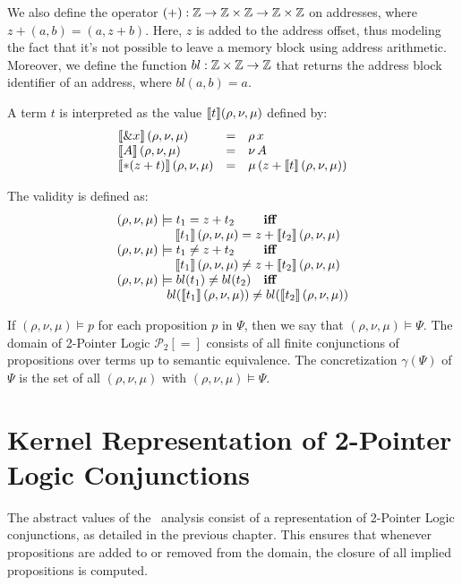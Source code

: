 We also define the operator $(+) : \mathbb{Z} \rightarrow \mathbb{Z} \times \mathbb{Z} \rightarrow \mathbb{Z} \times \mathbb{Z}$ on addresses, where $z + (a,b) = (a, z+b)$.
Here, $z$ is added to the address offset, thus modeling the fact that it's not possible to leave a memory block using address arithmetic.
Moreover, we define the function $bl : \mathbb{Z} \times \mathbb{Z} \rightarrow \mathbb{Z}$ that returns the address block identifier of an address, where $bl(a,b) = a$.

A term $t$ is interpreted as the value $\llbracket t\rrbracket(\rho, \nu, \mu)$ defined by:
\[
  \begin{array}{lll}
    \llbracket\& x\rrbracket\,(\rho,\nu,\mu)   & = & \rho\,x                          \\
    \llbracket A\rrbracket\,(\rho,\nu,\mu)      & = & \nu\,A                           \\
    \llbracket*(z+t)\rrbracket\,(\rho,\nu,\mu) & = & \mu\,(z+\llbracket t\rrbracket\,(\rho,\nu,\mu)) \\
  \end{array}
\]

The validity is defined as:
\[
  \begin{array}{ll}
    (\rho,\nu,\mu)\models t_1 = z+t_2          & \textbf{iff}
    \\ \multicolumn{2}{c}{\quad\quad\quad\quad\sem{t_1}\,(\rho,\nu,\mu) = z+\sem{t_2}\,(\rho,\nu,\mu)}	\\
    (\rho,\nu,\mu)\models t_1 \neq z+t_2       & \textbf{iff}
    \\ \multicolumn{2}{c}{\quad\quad\quad\quad\sem{t_1}\,(\rho,\nu,\mu) \neq z+\sem{t_2}\,(\rho,\nu,\mu)}	\\
    (\rho,\nu,\mu)\models bl(t_1) \neq bl(t_2) & \textbf{iff}
    \\ \multicolumn{2}{c}{\quad\quad\quad\quad bl(\sem{t_1}\,(\rho, \nu, \mu)) \neq bl(\sem{t_2}\,(\rho, \nu, \mu))}
  \end{array}
\]

If $(\rho, \nu, \mu)\models p$ for each proposition $p$ in $\Psi$, then we say that $(\rho, \nu, \mu) \models \Psi$.
The domain of 2-Pointer Logic $\mathcal{P}_2[=]$ consists of all finite conjunctions
of propositions over terms up to semantic equivalence.
The concretization $\gamma(\Psi)$ of $\Psi$ is the set of all $(\rho, \nu, \mu)$ with $(\rho, \nu, \mu) \models \Psi$.






\section{Kernel Representation of 2-Pointer Logic Conjunctions}
The abstract values of the \cpo\ analysis consist of a representation
of 2-Pointer Logic conjunctions, as detailed in the previous chapter.
This ensures that whenever propositions are added to or removed from the domain,
the closure of all implied propositions is computed.

